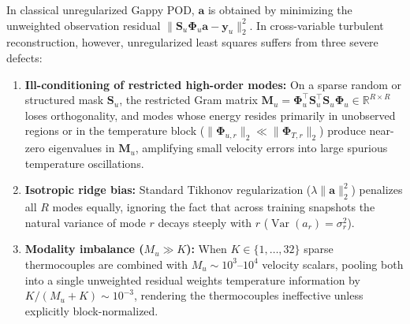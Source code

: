 In classical unregularized Gappy POD, $\mathbf{a}$ is obtained by minimizing the unweighted observation residual $\|\mathbf{S}_u \boldsymbol{\Phi}_u \mathbf{a} - \mathbf{y}_u\|_2^2$. In cross-variable turbulent reconstruction, however, unregularized least squares suffers from three severe defects:
\begin{enumerate}
    \item \textbf{Ill-conditioning of restricted high-order modes:} On a sparse random or structured mask $\mathbf{S}_u$, the restricted Gram matrix $\mathbf{M}_u = \boldsymbol{\Phi}_u^\top \mathbf{S}_u^\top \mathbf{S}_u \boldsymbol{\Phi}_u \in \mathbb{R}^{R \times R}$ loses orthogonality, and modes whose energy resides primarily in unobserved regions or in the temperature block ($\|\boldsymbol{\Phi}_{u,r}\|_2 \ll \|\boldsymbol{\Phi}_{T,r}\|_2$) produce near-zero eigenvalues in $\mathbf{M}_u$, amplifying small velocity errors into large spurious temperature oscillations.
    \item \textbf{Isotropic ridge bias:} Standard Tikhonov regularization ($\lambda \|\mathbf{a}\|_2^2$) penalizes all $R$ modes equally, ignoring the fact that across training snapshots the natural variance of mode $r$ decays steeply with $r$ ($\operatorname{Var}(a_r) = \sigma_r^2$).
    \item \textbf{Modality imbalance ($M_u \gg K$):} When $K \in \{1, \dots, 32\}$ sparse thermocouples are combined with $M_u \sim 10^3\text{--}10^4$ velocity scalars, pooling both into a single unweighted residual weights temperature information by $K / (M_u + K) \sim 10^{-3}$, rendering the thermocouples ineffective unless explicitly block-normalized.
\end{enumerate}

